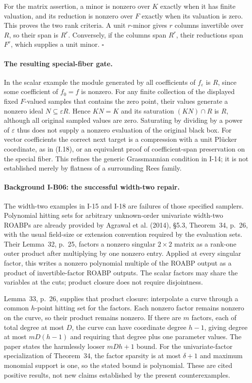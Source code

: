 \documentclass[11pt,a4paper]{article}
\theoremstyle{definition}\newtheorem{definition}{Definition}
\begin{document}
For the matrix assertion, a minor is nonzero over $K$ exactly when
it has finite valuation, and its reduction is nonzero over $F$
exactly when its valuation is zero.  This proves the two rank
criteria.  A unit $r$-minor gives $r$ columns invertible over $R$,
so their span is $R^r$.  Conversely, if the columns span $R^r$,
their reductions span $F^r$, which supplies a unit minor.
\hfill$\square$

\paragraph{The resulting special-fiber gate.}
In the scalar example the module generated by all coefficients of
$f_\varepsilon$ is $R$, since some coefficient of $f_0=f$ is nonzero.
For any finite collection of the displayed fixed $F$-valued samples
that contains the zero point, their values generate a nonzero ideal $N\subseteq
\varepsilon R$.  Hence $K N=K$ and its saturation
$(KN)\cap R$ is $R$, although all original sampled values are zero.
Saturating by dividing by a power of $\varepsilon$ thus does not
supply a nonzero evaluation of the original black box.
For vector coefficients the correct next target is a compression
with a unit Pl\"ucker coordinate, as in (I.18), or an equivalent
proof of coefficient-span preservation on the special fiber.
This refines the generic Grassmannian condition in I-14; it is not
established merely by flatness of a surrounding Rees family.

\paragraph{Background I-B06: the successful width-two repair.}
The width-two examples in I-15 and I-18 are failures of those
specified samplers.  Polynomial hitting sets for arbitrary
unknown-order univariate width-two ROABPs are already provided by
Agrawal et al. (2014), \S5.3, Theorem~34, p.~26, with the usual
field-size or extension convention required by the evaluation sets.
Their Lemma~32, p.~25, factors a nonzero singular $2\times2$ matrix
as a rank-one outer product after multiplying by one nonzero entry.
Applied at every singular factor, this writes a nonzero polynomial
multiple of the ROABP output as a product of invertible-factor
ROABP outputs.  The scalar factors may share the variables at the
cuts; product closure does not require disjointness.

Lemma~33, p.~26, supplies that product closure: interpolate a curve
through a common $h$-point hitting set for the factors.  Each nonzero
factor remains nonzero on the curve, so their product remains
nonzero.  If there are $m$ factors, each of total degree at most $D$,
the curve can have coordinate degree $h-1$, giving degree at most
$mD(h-1)$ and requiring that degree plus one parameter values.
The paper states the harmlessly looser $mDh+1$ bound.  For the
univariate-factor specialization of Theorem~34, the factor sparsity
is at most $\delta+1$ and maximum monomial support is one, so the
stated bound is polynomial.  These are cited positive results,
not new claims established by the present counterexamples.
\end{document}
